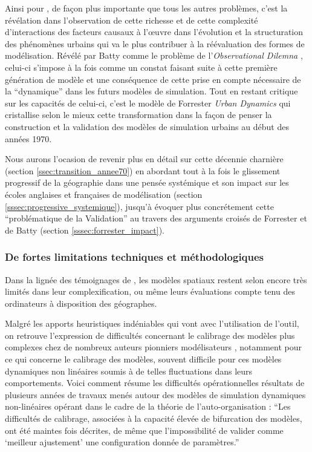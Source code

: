 Ainsi pour \textcite[11]{Batty1976}, de façon plus importante que tous les autres problèmes, c'est la révélation dans l'observation de cette richesse et de cette complexité d'interactions des facteurs causaux à l’œuvre dans l'évolution et la structuration des phénomènes urbains qui va le plus contribuer à la réévaluation des formes de modélisation. Révélé par Batty comme le problème de l'\textit{Observational Dilemna} \autocite[11,296]{Batty1976}, celui-ci s'impose à la fois comme un constat faisant suite à cette première génération de modèle et une conséquence de cette prise en compte nécessaire de la \enquote{dynamique} dans les futurs modèles de simulation. Tout en restant critique sur les capacités de celui-ci, c'est le modèle de Forrester \textit{Urban Dynamics} \autocite{Forrester1969} qui cristallise selon \textcites{Batty2001, Batty2005b} le mieux cette transformation dans la façon de penser la construction et la validation des modèles de simulation urbains au début des années 1970.

Nous aurons l'ocasion de revenir plus en détail sur cette décennie charnière (section \ref{ssec:transition_annee70}) en abordant tout à la fois le glissement progressif de la géographie dans une pensée systémique et son impact sur les écoles anglaises et françaises de modélisation (section \ref{sssec:progressive_systemique}), jusqu'à évoquer plus concrétement cette \enquote{problématique de la Validation} au travers des arguments croisés de Forrester et de Batty (section \ref{sssec:forrester_impact}).

\subsubsection{De fortes limitations techniques et méthodologiques}
\label{ssec:limitation_techniques_methodologiques}

Dans la lignée des témoignages de \textcite{Marble1972}, les modèles spatiaux restent selon \textcite{Batty1976} encore très limités dans leur complexification, ou même leurs évaluations compte tenu des ordinateurs à disposition des géographes.

Malgré les apports heuristiques indéniables qui vont avec l'utilisation de l'outil, on retrouve l'expression de difficultés concernant le calibrage des modèles plus complexes chez de nombreux auteurs pionniers modélisateurs \autocites{Batty1976,Pumain1983b}[400]{Sanders1984}, notamment pour ce qui concerne le calibrage des modèles, souvent difficile pour ces modèles dynamiques non linéaires soumis à de telles fluctuations dans leurs comportements. Voici comment \autocite{Pumain1998a} résume les difficultés opérationnelles résultats de plusieurs années de travaux menés autour des modèles de simulation dynamiques non-linéaires opérant dans le cadre de la théorie de l'auto-organisation : \enquote{Les difficultés de calibrage, associées à la capacité élevée de bifurcation des modèles, ont été maintes fois décrites, de même que l’impossibilité de valider comme \enquote{meilleur ajustement} une configuration donnée de paramètres.}

